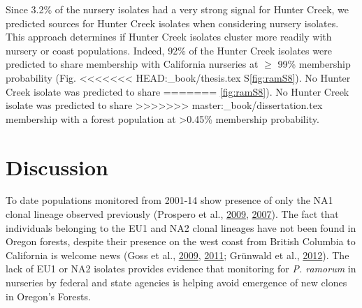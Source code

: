 \documentclass[double,12pt]{beavtex}
\begin{document}
  Since 3.2\% of the nursery isolates had a very strong signal for Hunter
  Creek, we predicted sources for Hunter Creek isolates when considering
  nursery isolates. This approach determines if Hunter Creek isolates
  cluster more readily with nursery or coast populations. Indeed, 92\% of
  the Hunter Creek isolates were predicted to share membership with
  California nurseries at \(\geq\) 99\% membership probability (Fig.
<<<<<<< HEAD:_book/thesis.tex
  S\ref{fig:ramS8}). No Hunter Creek isolate was predicted to share
=======
  \ref{fig:ramS8}). No Hunter Creek isolate was predicted to share
>>>>>>> master:_book/dissertation.tex
  membership with a forest population at \textgreater{}0.45\% membership
  probability.
  
  \section{Discussion}\label{discussion-1}
  
  To date populations monitored from 2001-14 show presence of only the NA1
  clonal lineage observed previously (Prospero et al.,
  \protect\hyperlink{ref-prospero2009migration}{2009},
  \protect\hyperlink{ref-prospero2007population}{2007}). The fact that
  individuals belonging to the EU1 and NA2 clonal lineages have not been
  found in Oregon forests, despite their presence on the west coast from
  British Columbia to California is welcome news (Goss et al.,
  \protect\hyperlink{ref-goss2009population}{2009},
  \protect\hyperlink{ref-goss2011phytophthora}{2011}; Grünwald et al.,
  \protect\hyperlink{ref-grunwald2012emergence}{2012}). The lack of EU1 or
  NA2 isolates provides evidence that monitoring for \emph{P. ramorum} in
  nurseries by federal and state agencies is helping avoid emergence of
  new clones in Oregon's Forests.
  
\end{document}
